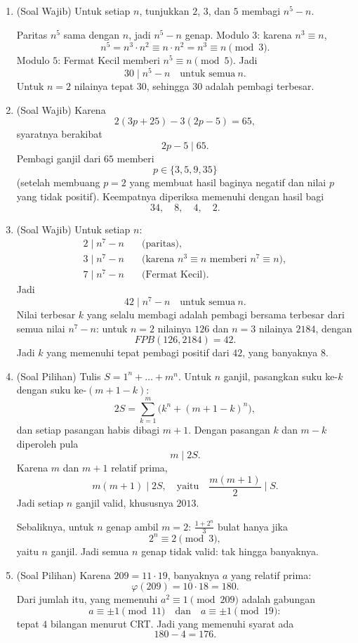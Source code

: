 \documentclass[12pt]{scrartcl}
\begin{document}
\begin{enumerate}
	\item (Soal Wajib) Untuk setiap $n$, tunjukkan $2$, $3$, dan $5$ membagi $n^5 - n$.

	Paritas $n^5$ sama dengan $n$, jadi $n^5 - n$ genap.
	Modulo $3$: karena $n^3 \equiv n$,
	\[ n^5 = n^3 \cdot n^2 \equiv n \cdot n^2 = n^3 \equiv n \pmod{3}. \]
	Modulo $5$: Fermat Kecil memberi $n^5 \equiv n \pmod{5}$.
	Jadi
	\[ 30 \mid n^5 - n \quad \text{untuk semua} \ n. \]
	Untuk $n = 2$ nilainya tepat $30$, sehingga $30$ adalah pembagi terbesar.

	\item (Soal Wajib) Karena
	\[ 2(3p+25) - 3(2p-5) = 65, \]
	syaratnya berakibat
	\[ 2p - 5 \mid 65. \]
	Pembagi ganjil dari $65$ memberi
	\[ p \in \{3, 5, 9, 35\} \]
	(setelah membuang $p = 2$ yang membuat hasil baginya negatif
	dan nilai $p$ yang tidak positif).
	Keempatnya diperiksa memenuhi dengan hasil bagi
	\[ 34, \quad 8, \quad 4, \quad 2. \]

	\item (Soal Wajib) Untuk setiap $n$:
	\begin{align*}
	2 \mid n^7 - n &\quad \text{(paritas)}, \\
	3 \mid n^7 - n &\quad \text{(karena $n^3 \equiv n$ memberi $n^7 \equiv n$)}, \\
	7 \mid n^7 - n &\quad \text{(Fermat Kecil)}.
	\end{align*}
	Jadi
	\[ 42 \mid n^7 - n \quad \text{untuk semua} \ n. \]
	Nilai terbesar $k$ yang selalu membagi adalah pembagi bersama terbesar
	dari semua nilai $n^7 - n$:
	untuk $n = 2$ nilainya $126$ dan $n = 3$ nilainya $2184$,
	dengan
	\[ FPB(126, 2184) = 42. \]
	Jadi $k$ yang memenuhi tepat pembagi positif dari $42$,
	yang banyaknya $8$.

	\item (Soal Pilihan) Tulis $S = 1^n + \dots + m^n$.
	Untuk $n$ ganjil, pasangkan suku ke-$k$ dengan suku ke-$(m+1-k)$:
	\[ 2S = \sum_{k=1}^{m} \bigl(k^n + (m+1-k)^n\bigr), \]
	dan setiap pasangan habis dibagi $m + 1$.
	Dengan pasangan $k$ dan $m - k$ diperoleh pula
	\[ m \mid 2S. \]
	Karena $m$ dan $m + 1$ relatif prima,
	\[ m(m+1) \mid 2S, \quad \text{yaitu} \quad \frac{m(m+1)}{2} \mid S. \]
	Jadi setiap $n$ ganjil valid, khususnya $2013$.

	Sebaliknya, untuk $n$ genap ambil $m = 2$:
	$\frac{1 + 2^n}{3}$ bulat hanya jika
	\[ 2^n \equiv 2 \pmod{3}, \]
	yaitu $n$ ganjil. Jadi semua $n$ genap tidak valid:
	tak hingga banyaknya.

	\item (Soal Pilihan) Karena $209 = 11 \cdot 19$, banyaknya $a$ yang relatif prima:
	\[ \varphi(209) = 10 \cdot 18 = 180. \]
	Dari jumlah itu, yang memenuhi $a^2 \equiv 1 \pmod{209}$ adalah gabungan
	\[ a \equiv \pm 1 \pmod{11} \quad \text{dan} \quad a \equiv \pm 1 \pmod{19}: \]
	tepat $4$ bilangan menurut CRT.
	Jadi yang memenuhi syarat ada
	\[ 180 - 4 = 176. \]
\end{enumerate}
\end{document}
